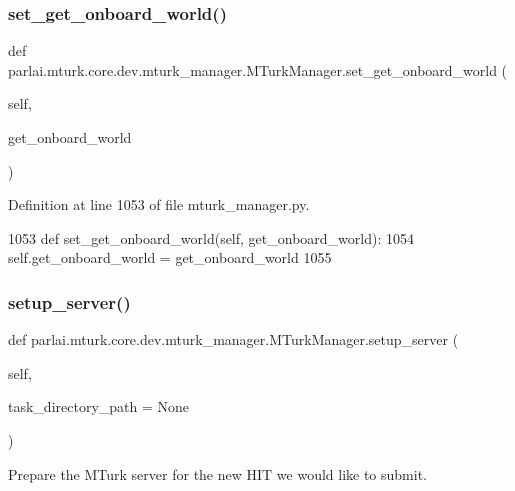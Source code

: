 \subsubsection{\texorpdfstring{set\+\_\+get\+\_\+onboard\+\_\+world()}{set\_get\_onboard\_world()}}
{\footnotesize\ttfamily def parlai.\+mturk.\+core.\+dev.\+mturk\+\_\+manager.\+M\+Turk\+Manager.\+set\+\_\+get\+\_\+onboard\+\_\+world (\begin{DoxyParamCaption}\item[{}]{self,  }\item[{}]{get\+\_\+onboard\+\_\+world }\end{DoxyParamCaption})}



Definition at line 1053 of file mturk\+\_\+manager.\+py.


\begin{DoxyCode}
1053     \textcolor{keyword}{def }set\_get\_onboard\_world(self, get\_onboard\_world):
1054         self.get\_onboard\_world = get\_onboard\_world
1055 
\end{DoxyCode}
\mbox{\label{classparlai_1_1mturk_1_1core_1_1dev_1_1mturk__manager_1_1MTurkManager_a9dadf9294a803cba4d1dc67e3a570a00}} 
\subsubsection{\texorpdfstring{setup\+\_\+server()}{setup\_server()}}
{\footnotesize\ttfamily def parlai.\+mturk.\+core.\+dev.\+mturk\+\_\+manager.\+M\+Turk\+Manager.\+setup\+\_\+server (\begin{DoxyParamCaption}\item[{}]{self,  }\item[{}]{task\+\_\+directory\+\_\+path = {\ttfamily None} }\end{DoxyParamCaption})}

\begin{DoxyVerb}Prepare the MTurk server for the new HIT we would like to submit.
\end{DoxyVerb}
 

